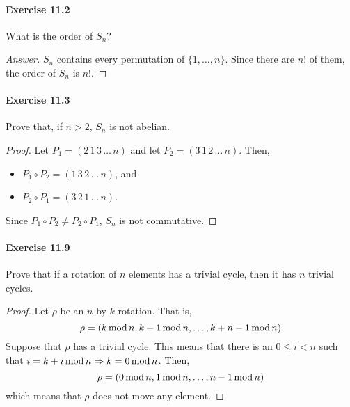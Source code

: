 \paragraph{Exercise 11.2}
What is the order of $S_n$?

\begin{proof}[Answer]
$S_n$ contains every permutation of $\{1,\dots,n\}$. Since there are $n!$ of
them, the order of $S_n$ is $n!$.
\end{proof}

\paragraph{Exercise 11.3}
Prove that, if $n > 2$, $S_n$ is not abelian.

\begin{proof}
Let $P_1 = (2 \, 1 \, 3 \, \dots \, n)$ and let
$P_2 = (3 \, 1 \, 2 \, \dots \, n)$. Then,
\begin{itemize}
    \item $P_1 \circ P_2 = (1 \, 3 \, 2 \, \dots \, n)$, and
    \item $P_2 \circ P_1 = (3 \, 2 \, 1 \, \dots \, n)$.
\end{itemize}
Since $P_1 \circ P_2 \neq P_2 \circ P_1$, $S_n$ is not commutative.
\end{proof}


\paragraph{Exercise 11.9}
Prove that if a rotation of $n$ elements has a trivial cycle, then it has $n$
trivial cycles.

\begin{proof}
Let $\rho$ be an $n$ by $k$ rotation. That is,
$$\rho = (k \, \mathrm{mod} \, n, k+1 \, \mathrm{mod} \, n, \dots, k+n-1 \, \mathrm{mod} \, n)$$
Suppose that $\rho$ has a trivial cycle. This means that there is an
$0 \leq i < n$ such that $i = k + i \, \mathrm{mod} \, n \Rightarrow 
k = 0 \, \mathrm{mod} \, n$. Then, 
$$\rho = (0 \, \mathrm{mod} \, n, 1 \, \mathrm{mod} \, n, \dots, n-1 \, \mathrm{mod} \, n)$$
which means that $\rho$ does not move any element.
\end{proof}
